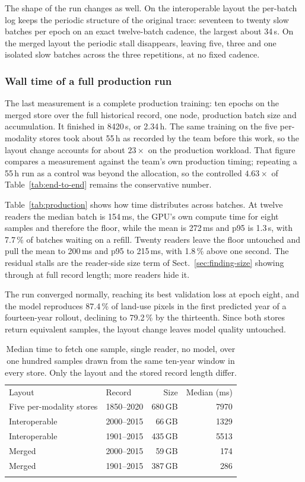 \documentclass[gmd, manuscript]{copernicus}
\begin{document}
The shape of the run changes as well. On the interoperable layout the per-batch log keeps the
periodic structure of the original trace: seventeen to twenty slow batches per epoch on an
exact twelve-batch cadence, the largest about 34\,s. On the merged layout the periodic stall
disappears, leaving five, three and one isolated slow batches across the three repetitions, at
no fixed cadence.

\subsubsection{Wall time of a full production run}

The last measurement is a complete production training: ten epochs on the merged store over the
full historical record, one node, production batch size and accumulation. It finished in
8420\,s, or 2.34\,h. The same training on the five per-modality stores took about 55\,h as
recorded by the team before this work, so the layout change accounts for about $23\times$ on
the production workload. That figure compares a measurement against the team's own production
timing; repeating a 55\,h run as a control was beyond the allocation, so the controlled
$4.63\times$ of Table~\ref{tab:end-to-end} remains the conservative number.

Table~\ref{tab:production} shows how time distributes across batches. At twelve readers the
median batch is 154\,ms, the GPU's own compute time for eight samples and therefore the floor,
while the mean is 272\,ms and p95 is 1.3\,s, with 7.7\,\% of batches waiting on a refill.
Twenty readers leave the floor untouched and pull the mean to 200\,ms and p95 to 215\,ms, with
1.8\,\% above one second. The residual stalls are the reader-side size term of
Sect.~\ref{sec:finding-size} showing through at full record length; more readers hide it.

The run converged normally, reaching its best validation loss at epoch eight, and the model
reproduces 87.4\,\% of land-use pixels in the first predicted year of a fourteen-year rollout,
declining to 79.2\,\% by the thirteenth. Since both stores return equivalent samples, the
layout change leaves model quality untouched.

\begin{table}[t]
\caption{Median time to fetch one sample, single reader, no model, over one hundred samples
drawn from the same ten-year window in every store. Only the layout and the stored record
length differ.}
\label{tab:per-sample}
\begin{tabular}{llrr}
\tophline
Layout & Record & Size & Median (ms) \\
\middlehline
Five per-modality stores & 1850--2020 & 680\,GB & 7970 \\
Interoperable            & 2000--2015 &  66\,GB & 1329 \\
Interoperable            & 1901--2015 & 435\,GB & 5513 \\
Merged                   & 2000--2015 &  59\,GB &  174 \\
Merged                   & 1901--2015 & 387\,GB &  286 \\
\bottomhline
\end{tabular}
\end{table}
\end{document}
